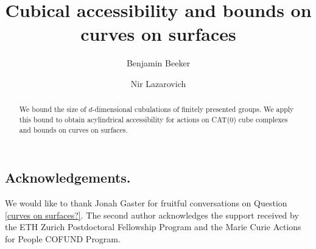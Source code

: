 \documentclass{amsart} %
\title{Cubical accessibility and bounds on curves on surfaces}
\author{Benjamin Beeker}
\author{Nir Lazarovich}
\date{} %
\begin{document}
\begin{abstract}
We bound the size of $d$-dimensional cubulations of finitely presented groups.
We apply this bound to obtain acylindrical accessibility for actions on CAT(0) cube complexes and bounds on curves on surfaces.
\end{abstract}

\maketitle



\subsection*{Acknowledgements.}

We would like to thank Jonah Gaster for fruitful conversations on Question \ref{curves on surfaces?}. The second author acknowledges the support received by the ETH Zurich Postdoctoral Fellowship Program and the Marie Curie Actions for People COFUND Program.









\end{document}
